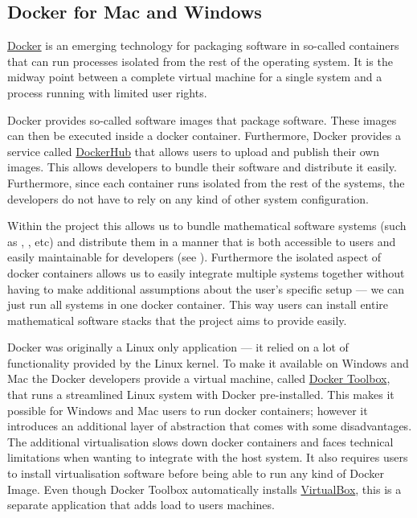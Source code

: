 \documentclass{deliverablereport}
\begin{document}
\subsection{Docker for Mac and Windows}
\label{sec:docker}


\href{https://www.docker.com}{Docker} is an emerging technology for
packaging software in so-called containers that can run processes
isolated from the rest of the operating system. It is the midway point
between a complete virtual machine for a single system and a
process running with limited user rights.

Docker provides so-called software images that package software. These
images can then be executed inside a docker container. Furthermore,
Docker provides a service called
\href{https://hub.docker.com/}{DockerHub} that allows users to upload
and publish their own images. This allows developers to bundle their
software and distribute it easily. Furthermore, since each container
runs isolated from the rest of the systems, the developers do not have
to rely on any kind of other system configuration.

Within the \ODK project this allows us to bundle mathematical software
systems (such as \GAP, \Sage, etc) and distribute them in a manner
that is both accessible to users and easily maintainable for
developers (see ). Furthermore the isolated aspect of docker containers
allows us to easily integrate multiple systems together without having
to make additional assumptions about the user's specific setup --- we
can just run all systems in one docker container. This way users can
install entire mathematical software stacks that the \ODK project
aims to provide easily.

Docker was originally a Linux only application --- it relied on a lot
of functionality provided by the Linux kernel. To make it available on
Windows and Mac the Docker developers provide a virtual machine, called
\href{https://www.docker.com/products/docker-toolbox}{Docker Toolbox},
that runs a streamlined Linux system with Docker pre-installed. This
makes it possible for Windows and Mac users to run docker containers;
however it introduces an additional layer of abstraction that comes
with some disadvantages. The additional virtualisation slows down
docker containers and faces technical limitations when wanting to
integrate with the host system. It also requires users to install
virtualisation software before being able to run any kind of Docker
Image. Even though Docker Toolbox automatically installs
\href{https://www.virtualbox.org/}{VirtualBox}, this is a separate
application that adds load to users machines.
\end{document}
